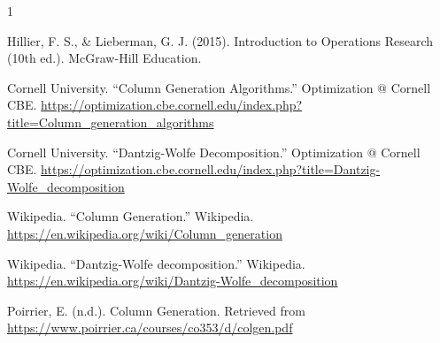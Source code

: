 \documentclass[11pt]{article}
\begin{document}
\begin{thebibliography}{1}

    Hillier, F. S., \& Lieberman, G. J. (2015). Introduction to Operations Research (10th ed.). McGraw-Hill Education.

Cornell University. ``Column Generation Algorithms.'' Optimization @ Cornell CBE. 
\url{https://optimization.cbe.cornell.edu/index.php?title=Column_generation_algorithms}

Cornell University. ``Dantzig-Wolfe Decomposition.'' Optimization @ Cornell CBE. 
\url{https://optimization.cbe.cornell.edu/index.php?title=Dantzig-Wolfe_decomposition}

Wikipedia. ``Column Generation.'' Wikipedia. 
\url{https://en.wikipedia.org/wiki/Column_generation}

Wikipedia. ``Dantzig-Wolfe decomposition.'' Wikipedia. 
\url{https://en.wikipedia.org/wiki/Dantzig-Wolfe_decomposition}

Poirrier, E. (n.d.). Column Generation. Retrieved from \url{https://www.poirrier.ca/courses/co353/d/colgen.pdf}

\end{thebibliography}
\end{document}
